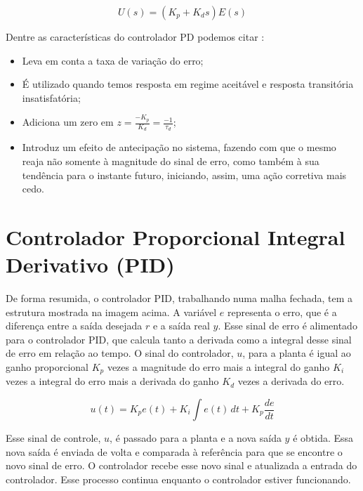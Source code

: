 \documentclass[
	12pt,				%
	openany,			%
	oneside,			%
	a4paper,			%
	english,			%
	french,				%
	spanish,			%
	brazil,				%
	]{abntex2}
\begin{document}
{\begin{equation}
U(s) = (K_p + K_ds)E(s)
\end{equation}

Dentre as características do controlador PD podemos citar \cite{meneghetti1}:

\begin{itemize}
    \item Leva em conta a taxa de variação do erro;
    \item É utilizado quando temos resposta em regime aceitável e resposta transitória insatisfatória;
    \item Adiciona um zero em $z = \frac{-K_p}{K_d}= \frac{-1}{\tau_d}$;
    \item Introduz um efeito de antecipação no sistema, fazendo com que o mesmo reaja não somente à magnitude do sinal de erro, como também à sua tendência para o instante futuro, iniciando, assim, uma ação corretiva mais cedo.
\end{itemize}

\section{Controlador Proporcional Integral Derivativo (PID)}


De forma resumida, o controlador PID, trabalhando numa malha fechada, tem a estrutura mostrada na imagem acima. A variável $e$ representa o erro, que é a diferença entre a saída desejada $r$ e a saída real $y$. Esse sinal de erro é alimentado para o controlador PID, que calcula tanto a derivada como a integral desse sinal de erro em relação ao tempo. O sinal do controlador, $u$, para a planta é igual ao ganho proporcional $K_p$ vezes a magnitude do erro mais a integral do ganho $K_i$ vezes a integral do erro mais a derivada do ganho $K_d$ vezes a derivada do erro.

\begin{equation}
u(t) = K_pe(t) + K_i\int e(t)\,dt + K_p\frac{de}{dt}
\end{equation}

Esse sinal de controle, $u$, é passado para a planta e a nova saída $y$ é obtida. Essa nova saída é enviada de volta e comparada à referência para que se encontre o novo sinal de erro. O controlador recebe esse novo sinal e atualizada a entrada do controlador. Esse processo continua enquanto o controlador estiver funcionando.

}
\end{document}
